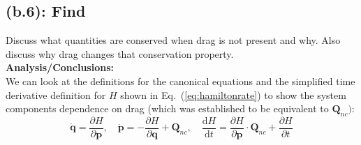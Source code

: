 \documentclass[titlepage]{article}
\begin{document}
\subsection*{(b.6): Find}

Discuss what quantities are conserved when drag is not present and why. Also discuss why drag changes that conservation property. \\

\textbf{Analysis/Conclusions:}\\

We can look at the definitions for the canonical equations and the simplified time derivative definition for $H$ shown in Eq.~(\ref{eq:hamiltonrate}) to show the system components dependence on drag (which was established to be equivalent to $\boldsymbol{Q}_{nc})$:
\begin{equation}
	\dot{\boldsymbol{q}}=\frac{\partial H}{\partial\boldsymbol{p}},\quad\dot{\boldsymbol{p}}=-\frac{\partial H}{\partial\boldsymbol{q}}+\boldsymbol{Q}_{nc}, \quad\frac{\mathrm{d}H}{\mathrm{d}t}=\frac{\partial H}{\partial\boldsymbol{p}}\cdot\boldsymbol{Q}_{nc}+\frac{\partial H}{\partial t}
\end{equation}
\end{document}
